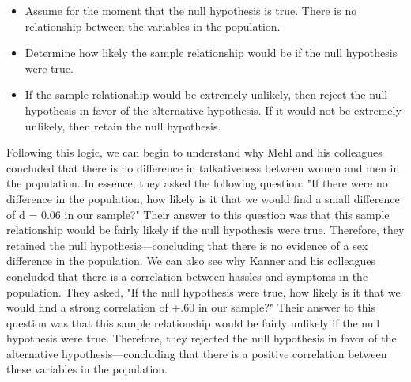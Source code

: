 \begin{itemize}
\item Assume for the moment that the null hypothesis is true. There is no relationship between the variables in the population.

\item Determine how likely the sample relationship would be if the null hypothesis were true.

\item If the sample relationship would be extremely unlikely, then reject the null hypothesis in favor of the
alternative hypothesis. If it would not be extremely unlikely, then retain the null hypothesis.

\end{itemize}

Following this logic, we can begin to understand why Mehl and his colleagues concluded that there is no difference in talkativeness between women and men in the population. In essence, they asked the following question: "If there were no difference in the population, how likely is it that we would find a small difference of d = 0.06 in our sample?" Their answer to this question was that this sample relationship would be fairly likely if the null hypothesis were true. Therefore, they retained the null hypothesis---concluding that there is no evidence of a sex difference in the population. We can also see why Kanner and his colleagues concluded that there is a correlation between hassles and symptoms in the population. They asked, "If the null hypothesis were true, how likely is it that we would find a strong correlation of +.60 in our sample?" Their answer to this question was that this sample relationship would be fairly unlikely if the null hypothesis were true. Therefore, they rejected the null hypothesis in favor of the alternative hypothesis---concluding that there is a positive correlation between these variables in the population.


